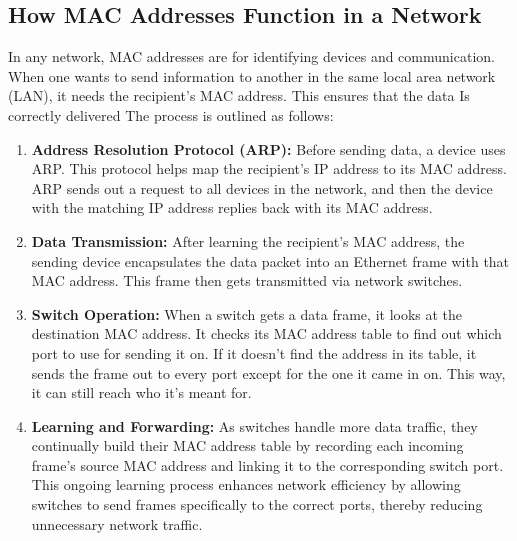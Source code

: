 \documentclass[11pt,a4paper]{article}
\begin{document}
\subsection*{How MAC Addresses Function in a Network}

In any network, MAC addresses are for identifying devices and communication. When one wants to send information to another in the same local area network (LAN), it needs the recipient's MAC address. This ensures that the data Is correctly delivered The process is outlined as follows:

\begin{enumerate}
    
    \item \textbf{Address Resolution Protocol (ARP):} Before sending data, a device uses ARP. This protocol helps map the recipient's IP address to its MAC address. ARP sends out a request to all devices in the network, and then the device with the matching IP address replies back with its MAC address.

    \item \textbf{Data Transmission:} After learning the recipient’s MAC address, the sending device encapsulates the data packet into an Ethernet frame with that MAC address. This frame then gets transmitted via network switches.

    \item \textbf{Switch Operation:} When a switch gets a data frame, it looks at the destination MAC address. It checks its MAC address table to find out which port to use for sending it on. If it doesn't find the address in its table, it sends the frame out to every port except for the one it came in on. This way, it can still reach who it's meant for.


    \item \textbf{Learning and Forwarding:} As switches handle more data traffic, they continually build their MAC address table by recording each incoming frame’s source MAC address and linking it to the corresponding switch port. This ongoing learning process enhances network efficiency by allowing switches to send frames specifically to the correct ports, thereby reducing unnecessary network traffic.

\end{enumerate}
\end{document}
